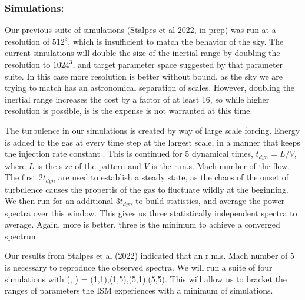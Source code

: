 \subsubsection{Simulations: \nameCMB}
\label{subsec.cmb_sims}

Our previous suite of simulations (Stalpes et al 2022, in prep) was run at a
resolution of  $512^3$, which is insufficient to match the behavior of the sky.
The current simulations will double the size of the inertial range by doubling
the resolution to $1024^3$, and target parameter space suggested by that
parameter suite.  In this case more resolution is better without
bound, as the sky we are trying to match has an astronomical separation of scales. However, doubling
the inertial range increases the cost by a factor of at least 16, so while
higher resolution is possible, is is the expense is not warranted at this time.

The turbulence in our simulations is created by way of large scale forcing. Energy is added to the gas at every time step at the largest scale, in a
manner that keeps the injection rate constant \citep{MacLow99, Schmidt09}.  This is
continued for 5 dynamical times, $t_{dyn}=L/V$, where $L$ is the size of the
pattern and $V$ is the r.m.s. Mach number of the flow.  The first $2 t_{dyn}$
are used to establish a steady state, as the chaos of the onset of turbulence
causes the propertis of the gas to fluctuate wildly at the beginning.   We then run for an additional $3 t_{dyn}$ to build statistics, and
average the power spectra over this window.  This gives us three statistically
independent spectra to average.  Again, more is better, three is the minimum to
achieve a converged spectrum.

Our results from Stalpes et al (2022) indicated that an r.m.s. Mach number of 5
is necessary to reproduce the observed spectra.  We will run a suite of four
simulations with (\mach, \alfmach) = (1,1),(1,5),(5,1),(5,5).  This will allow
us to bracket the ranges of parameters the ISM experiences with a minimum of
simulations.
